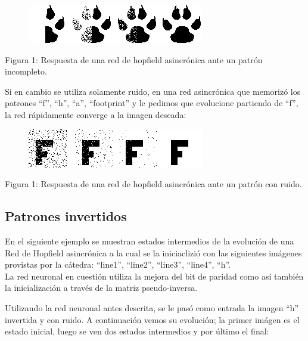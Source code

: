 \documentclass[%
    final,
    reprint,
    notitlepage,
    narroweqnarray,
    inline,
    twoside,
    invited
    ]{ieee}
\begin{document}
\begin{figure}[H]
\begin{center}
\includegraphics[scale=0.60]{./images/half.png}
\label{modelado}
\end{center}
\end{figure}

\begin{center}
\par Figura 1: Respuesta de una red de hopfield asincrónica ante un patrón incompleto.
\end{center}

\par Si en cambio se utiliza solamente ruido, en una red asincrónica que memorizó los patrones ``f'', ``h'', ``a'', ``footprint'' y le pedimos que evolucione partiendo de ``f'', la red rápidamente converge a la imagen deseada:

\begin{figure}[H]
\begin{center}
\includegraphics[scale=0.60]{./images/noisyf.png}
\label{modelado}
\end{center}
\end{figure}

\begin{center}
\par Figura 1: Respuesta de una red de hopfield asincrónica ante un patrón con ruido.
\end{center}



\subsection{Patrones invertidos}

\par En el siguiente ejemplo se muestran estados intermedios de la evolución de una Red de Hopfield asincrónica a la cual se la iniciaclizió con las siguientes imágenes provistas por la cátedra: ``line1'', ``line2'', ``line3'', ``line4'', ``h''.\\
La red neuronal en cuestión utiliza la mejora del bit de paridad como así también la inicialización a través de la matriz pseudo-inversa.\\
\par Utilizando la red neuronal antes descrita, se le pasó como entrada la imagen ``h'' invertida y con ruido. A continuación vemos su evolución; la primer imágen es el estado inicial, luego se ven dos estados intermedios y por último el final:\\
\end{document}
